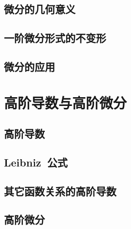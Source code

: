 \subsection{微分的几何意义}
\subsection{一阶微分形式的不变形}
\subsection{微分的应用}
\begin{exercise}
\item
\end{exercise}
\section{高阶导数与高阶微分}
\subsection{高阶导数}
\subsection{Leibniz~公式}
\subsection{其它函数关系的高阶导数}
\subsection{高阶微分}
\begin{exercise}
\item
\end{exercise}
\begin{exercise*}
\item
\end{exercise*}


\endinput
